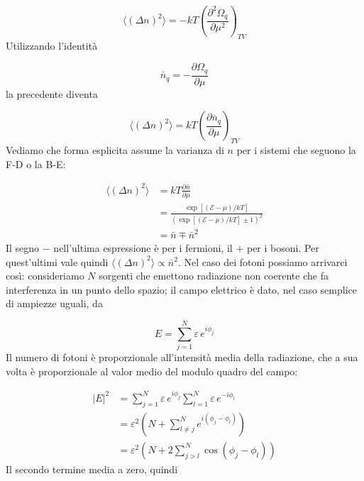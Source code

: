 \documentclass[a4paper]{report}
\begin{document}
\begin{equation}
    \langle(\Delta n)^2\rangle = - k T \left(\frac{\partial^2 \Omega_q}{\partial \mu^2}\right)_{TV}
\end{equation}
Utilizzando l'identità

\begin{equation}
    \bar{n}_q = -\frac{\partial \Omega_q}{\partial \mu}
\end{equation}
la precedente diventa

\begin{equation}
     \langle(\Delta n)^2\rangle =  k T \left(\frac{\partial \bar{n}_q}{\partial \mu}\right)_{TV}
\end{equation}
Vediamo che forma esplicita assume la varianza di $n$ per i sistemi che seguono la F-D o la B-E:

\begin{equation}
    \begin{split}
        \langle(\Delta n)^2\rangle & = k T \frac{\partial \bar{n}}{\partial \mu} \\
        & = \frac{\exp[(\mathcal{E}-\mu)/k T]}{(\exp[(\mathcal{E}-\mu)/k T]\pm 1)^{2}} \\
        & = \bar{n} \mp \bar{n}^2
    \end{split}
\end{equation}
Il segno $-$ nell'ultima espressione è per i fermioni, il $+$ per i bosoni. Per quest'ultimi vale quindi $\langle (\Delta n)^2\rangle \propto \bar{n}^2$. Nel caso dei fotoni possiamo arrivarci così: consideriamo $N$ sorgenti che emettono radiazione non coerente che fa interferenza in un punto dello spazio; il campo elettrico è dato, nel caso semplice di ampiezze uguali, da 

\begin{equation}
    E = \sum_{j=1}^{N}\varepsilon\,e^{i\phi_j}
\end{equation}
Il numero di fotoni è proporzionale all'intensità media della radiazione, che a sua volta è proporzionale al valor medio del modulo quadro del campo:

\begin{equation}
    \begin{split}
        |E|^2 & = \sum_{j=1}^{N}\varepsilon\,e^{i\phi_j} \sum_{l=1}^{N}\varepsilon\,e^{-i\phi_l} \\
        & = \varepsilon^2 \left(N + \sum_{l\neq j}^{N}e^{i(\phi_j-\phi_l)} \right) \\
        & = \varepsilon^2 \left(N + 2 \sum_{j>l}^{N} \cos(\phi_j-\phi_l)\right)
    \end{split}
\end{equation}
Il secondo termine media a zero, quindi 
\end{document}
